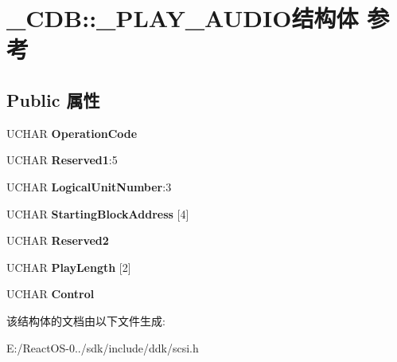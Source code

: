 \hypertarget{struct___c_d_b_1_1___p_l_a_y___a_u_d_i_o}{}\section{\+\_\+\+C\+DB\+:\+:\+\_\+\+P\+L\+A\+Y\+\_\+\+A\+U\+D\+I\+O结构体 参考}
\label{struct___c_d_b_1_1___p_l_a_y___a_u_d_i_o}
\subsection*{Public 属性}
\begin{DoxyCompactItemize}
\item 
\mbox{\label{struct___c_d_b_1_1___p_l_a_y___a_u_d_i_o_ae9cd36882628fbefba8370f94c2ecfba}} 
U\+C\+H\+AR {\bfseries Operation\+Code}
\item 
\mbox{\label{struct___c_d_b_1_1___p_l_a_y___a_u_d_i_o_a295e8344ac6d614b4f3f684920b3b892}} 
U\+C\+H\+AR {\bfseries Reserved1}\+:5
\item 
\mbox{\label{struct___c_d_b_1_1___p_l_a_y___a_u_d_i_o_a1dceab11e5ab50a2880c6ab01192f4fc}} 
U\+C\+H\+AR {\bfseries Logical\+Unit\+Number}\+:3
\item 
\mbox{\label{struct___c_d_b_1_1___p_l_a_y___a_u_d_i_o_a7526c1f8055686dd4bd7636e9d5cba58}} 
U\+C\+H\+AR {\bfseries Starting\+Block\+Address} \mbox{[}4\mbox{]}
\item 
\mbox{\label{struct___c_d_b_1_1___p_l_a_y___a_u_d_i_o_affe842e3ce786f47e329f92030197f05}} 
U\+C\+H\+AR {\bfseries Reserved2}
\item 
\mbox{\label{struct___c_d_b_1_1___p_l_a_y___a_u_d_i_o_a892efe3987bf8b51037dae3e41d050e0}} 
U\+C\+H\+AR {\bfseries Play\+Length} \mbox{[}2\mbox{]}
\item 
\mbox{\label{struct___c_d_b_1_1___p_l_a_y___a_u_d_i_o_a2de93e0de657199cc0b94b4a92588d2a}} 
U\+C\+H\+AR {\bfseries Control}
\end{DoxyCompactItemize}


该结构体的文档由以下文件生成\+:\begin{DoxyCompactItemize}
\item 
E\+:/\+React\+O\+S-\/0../sdk/include/ddk/scsi.\+h\end{DoxyCompactItemize}
